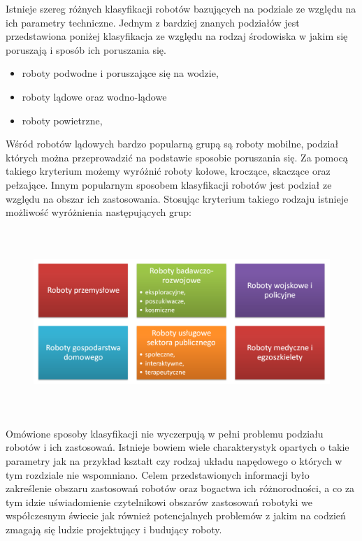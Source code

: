 Istnieje szereg różnych klasyfikacji robotów bazujących na podziale ze względu
na ich parametry techniczne. Jednym z bardziej znanych podziałów jest
przedstawiona poniżej klasyfikacja ze względu na rodzaj środowiska w jakim się
poruszają i sposób ich poruszania się.
\begin{itemize}
  \item roboty podwodne i poruszające się na wodzie,
  \item roboty lądowe oraz wodno-lądowe
  \item roboty powietrzne,
\end{itemize}
Wśród robotów lądowych bardzo popularną grupą są roboty mobilne, podział których
można przeprowadzić na podstawie sposobie poruszania się. Za pomocą takiego
kryterium możemy wyróżnić roboty kołowe, kroczące, skaczące oraz pełzające.
Innym popularnym sposobem klasyfikacji robotów jest podział ze względu na 
obszar ich zastosowania. Stosując kryterium takiego rodzaju istnieje możliwość
wyróżnienia następujących grup:
\begin{figure}[hb]
 \centering
 \includegraphics[height=70mm]{../images/ch01/robot_types.png}
 \label{fig:RobotsGenerations}
\end{figure}

Omówione sposoby klasyfikacji nie wyczerpują w pełni problemu podziału
robotów i ich zastosowań. Istnieje bowiem wiele charakterystyk opartych o takie
parametry jak na przykład kształt czy rodzaj układu napędowego o których w tym
rozdziale nie wspomniano. Celem przedstawionych informacji było zakreślenie
obszaru zastosowań robotów oraz bogactwa ich różnorodności, a co za tym idzie
uświadomienie czytelnikowi obszarów zastosowań robotyki we współczesnym świecie
jak również potencjalnych problemów z jakim na codzień zmagają się ludzie
projektujący i budujący roboty.
